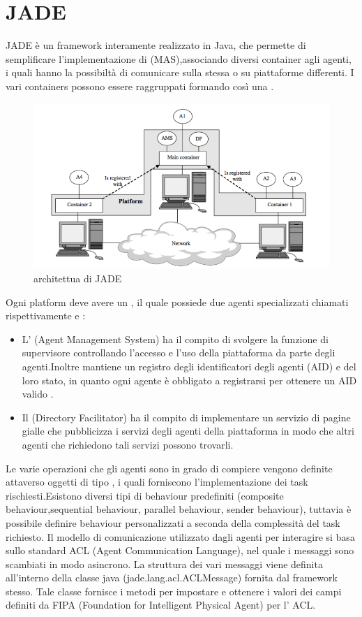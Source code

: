 \section{JADE}
JADE è un framework interamente realizzato in Java, che permette di  semplificare l'implementazione di  (MAS),associando diversi container agli agenti, i quali hanno la possibiltà di comunicare sulla stessa o su piattaforme differenti.
I vari containers possono essere raggruppati formando così una .
\begin{figure}[H]
\begin{center}
\includegraphics[scale=0.45]{etc/jade_architettura.png}
\caption{architettua di JADE}
\label{architettura_jade}
\end{center}
\end{figure} 
Ogni platform deve avere un , il quale possiede due agenti specializzati chiamati rispettivamente  e :
\begin{itemize}
\item L' (Agent Management System) ha il compito di svolgere la funzione di supervisore controllando l’accesso e l’uso della
piattaforma da parte degli agenti.Inoltre mantiene un registro degli identificatori degli agenti (AID) e del loro stato, in quanto ogni agente
 è obbligato a registrarsi per ottenere un AID valido . 
\item Il  (Directory Facilitator) ha il compito di implementare un servizio di pagine gialle che pubblicizza i servizi degli agenti della piattaforma in modo che altri agenti che richiedono tali servizi possono trovarli.
\end{itemize}
Le varie operazioni che gli agenti sono in grado di compiere vengono definite attaverso oggetti di tipo , i quali forniscono l'implementazione dei task rischiesti.Esistono diversi tipi di behaviour predefiniti (composite behaviour,sequential behaviour, parallel
behaviour, sender behaviour), tuttavia è possibile definire behaviour personalizzati a seconda della complessità del task richiesto.
Il modello di comunicazione utilizzato dagli agenti per interagire si basa sullo standard ACL (Agent Communication Language), nel quale i messaggi sono scambiati in modo asincrono. 
La struttura dei vari messaggi viene definita all'interno della classe java (jade.lang.acl.ACLMessage) fornita dal framework stesso.
Tale classe fornisce i metodi per impostare e ottenere i valori dei campi definiti da FIPA (Foundation for Intelligent Physical Agent) per l’ ACL.
